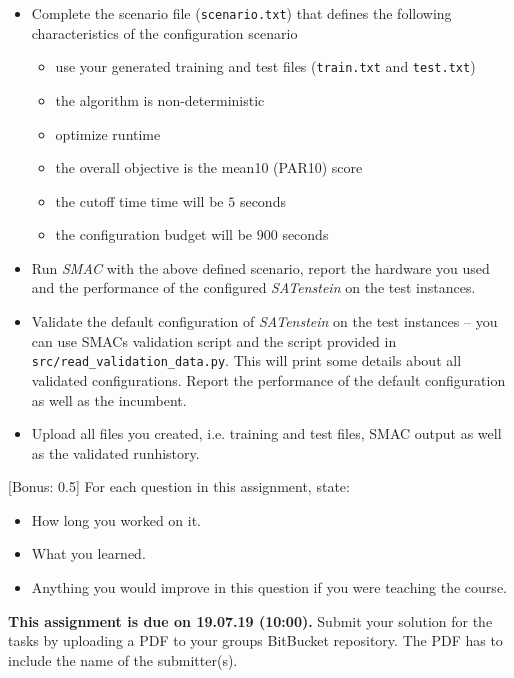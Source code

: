 \documentclass{exam}
\newcommand{\duedate}{19.07.19 (10:00)}
\newcommand{\due}{{\bf This assignment is due on \duedate.} }
\begin{document}
\begin{questions}
\begin{itemize}
			\item Complete the scenario file (\texttt{scenario.txt}) that defines the following characteristics of the configuration scenario
			\begin{itemize}
				\item use your generated training and test files (\texttt{train.txt} and \texttt{test.txt})
				\item the algorithm is non-deterministic
				\item optimize runtime
				\item the overall objective is the mean10 (PAR10) score
				\item the cutoff time time will be $5$ seconds
				\item the configuration budget will be $900$ seconds
			\end{itemize}
			\item Run \textit{SMAC} with the above defined scenario, report the hardware you used and the performance of the configured \textit{SATenstein} on the test instances.
			\item Validate the default configuration of \textit{SATenstein} on the test instances -- you can use SMACs validation script and the script provided in \texttt{src/read\_validation\_data.py}. This will print some details about all validated configurations.
			Report the performance of the default configuration as well as the incumbent.
			\item Upload all files you created, i.e. training and test files, SMAC output as well as the validated runhistory.
		\end{itemize}

		[Bonus: 0.5]
		For each question in this assignment, state:
		\begin{itemize}
			\item How long you worked on it.
			\item What you learned.
			\item Anything you would improve in this question if you were teaching the course.
		\end{itemize}
	\end{questions}
	
	\noindent
	\due Submit your solution for the tasks by uploading a PDF to your groups BitBucket repository. The PDF has to include the name of the submitter(s).
\end{document}
